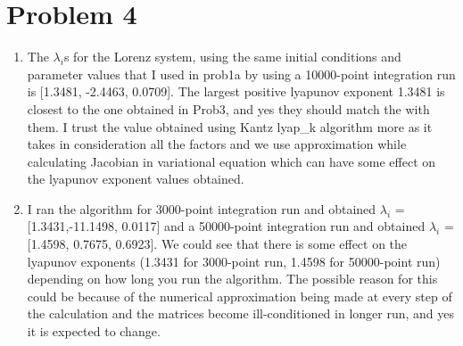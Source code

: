 \documentclass{article}
\begin{document}
\section*{Problem 4}
\begin{enumerate}[label=(\alph*)]

\item 
The $\lambda_{i}$s for the Lorenz system, using the same initial conditions and parameter values that I used in prob1a by using a 10000-point integration run is [1.3481, -2.4463, 0.0709]. The largest positive lyapunov exponent 1.3481 is closest to the one obtained in Prob3, and yes they should match the with them. I trust the value obtained using Kantz lyap\_k algorithm more as it takes in consideration all the factors and we use approximation while calculating Jacobian in variational equation which can have some effect on the lyapunov exponent values obtained.

\item
I ran the algorithm for 3000-point integration run and obtained $\lambda_{i}$ = [1.3431,-11.1498, 0.0117] and a 50000-point integration run and obtained $\lambda_{i}$ = [1.4598, 0.7675, 0.6923]. We could see that there is some effect on the lyapunov exponents (1.3431 for 3000-point run, 1.4598 for 50000-point run) depending on how long you run the algorithm. The possible reason for this could be because of the numerical approximation being made at every step of the calculation and the matrices become ill-conditioned in longer run, and yes it is expected to change.
\end{enumerate}
\end{document}
